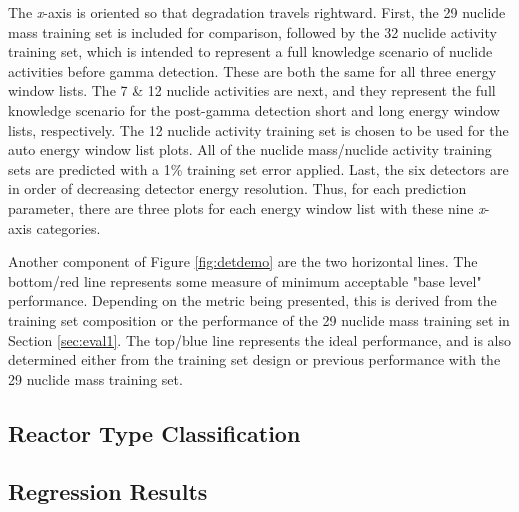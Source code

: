 The \textit{x}-axis is oriented so that degradation travels rightward.
First, the 29 nuclide mass training set is included for comparison, followed by
the 32 nuclide activity training set, which is intended to represent a full
knowledge scenario of nuclide activities before gamma detection. These are both
the same for all three energy window lists.  The 7 \& 12 nuclide activities are
next, and they represent the full knowledge scenario for the post-gamma
detection short and long energy window lists, respectively.  The 12 nuclide
activity training set is chosen to be used for the auto energy window list
plots.  All of the nuclide mass/nuclide activity training sets are predicted
with a 1\% training set error applied.  Last, the six detectors are in order of
decreasing detector energy resolution. Thus, for each prediction parameter,
there are three plots for each energy window list with these nine
\textit{x}-axis categories.

Another component of Figure \ref{fig:detdemo} are the two horizontal lines. The
bottom/red line represents some measure of minimum acceptable "base level"
performance.  Depending on the metric being presented, this is derived from the
training set composition or the performance of the 29 nuclide mass training set
in Section \ref{sec:eval1}. The top/blue line represents the ideal performance,
and is also determined either from the training set design or previous
performance with the 29 nuclide mass training set.

\subsection{Reactor Type Classification}


\subsection{Regression Results}


